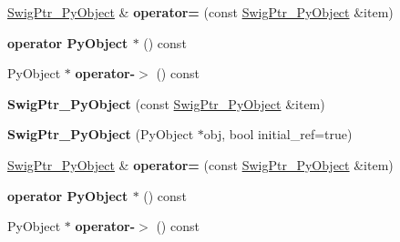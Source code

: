 \begin{DoxyCompactItemize}
\item 
\hypertarget{classswig_1_1SwigPtr__PyObject_a86d8657d6b4a27c8e9e6942bc1ba572c}{
\hyperlink{classswig_1_1SwigPtr__PyObject}{SwigPtr\_\-PyObject} \& {\bfseries operator=} (const \hyperlink{classswig_1_1SwigPtr__PyObject}{SwigPtr\_\-PyObject} \&item)}
\label{d2/d50/classswig_1_1SwigPtr__PyObject_a86d8657d6b4a27c8e9e6942bc1ba572c}

\item 
\hypertarget{classswig_1_1SwigPtr__PyObject_aa2f1cdba0651c7a52482d225faef0574}{
{\bfseries operator PyObject $\ast$} () const }
\label{d2/d50/classswig_1_1SwigPtr__PyObject_aa2f1cdba0651c7a52482d225faef0574}

\item 
\hypertarget{classswig_1_1SwigPtr__PyObject_a97a20cad6a2b0916f39c45555fb559f0}{
PyObject $\ast$ {\bfseries operator-\/$>$} () const }
\label{d2/d50/classswig_1_1SwigPtr__PyObject_a97a20cad6a2b0916f39c45555fb559f0}

\item 
\hypertarget{classswig_1_1SwigPtr__PyObject_a4282f20207f8cd22c9b079203c832a04}{
{\bfseries SwigPtr\_\-PyObject} (const \hyperlink{classswig_1_1SwigPtr__PyObject}{SwigPtr\_\-PyObject} \&item)}
\label{d2/d50/classswig_1_1SwigPtr__PyObject_a4282f20207f8cd22c9b079203c832a04}

\item 
\hypertarget{classswig_1_1SwigPtr__PyObject_a4503d58d577d209f5e1fa67026852505}{
{\bfseries SwigPtr\_\-PyObject} (PyObject $\ast$obj, bool initial\_\-ref=true)}
\label{d2/d50/classswig_1_1SwigPtr__PyObject_a4503d58d577d209f5e1fa67026852505}

\item 
\hypertarget{classswig_1_1SwigPtr__PyObject_a86d8657d6b4a27c8e9e6942bc1ba572c}{
\hyperlink{classswig_1_1SwigPtr__PyObject}{SwigPtr\_\-PyObject} \& {\bfseries operator=} (const \hyperlink{classswig_1_1SwigPtr__PyObject}{SwigPtr\_\-PyObject} \&item)}
\label{d2/d50/classswig_1_1SwigPtr__PyObject_a86d8657d6b4a27c8e9e6942bc1ba572c}

\item 
\hypertarget{classswig_1_1SwigPtr__PyObject_aa2f1cdba0651c7a52482d225faef0574}{
{\bfseries operator PyObject $\ast$} () const }
\label{d2/d50/classswig_1_1SwigPtr__PyObject_aa2f1cdba0651c7a52482d225faef0574}

\item 
\hypertarget{classswig_1_1SwigPtr__PyObject_a97a20cad6a2b0916f39c45555fb559f0}{
PyObject $\ast$ {\bfseries operator-\/$>$} () const }
\label{d2/d50/classswig_1_1SwigPtr__PyObject_a97a20cad6a2b0916f39c45555fb559f0}


\end{DoxyCompactItemize}
